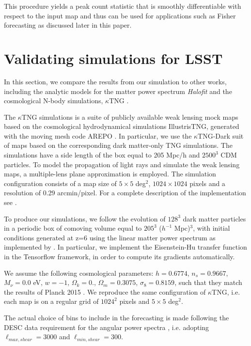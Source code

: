 \documentclass{aa}
\begin{document}
This procedure yields a peak count statistic that is smoothly differentiable with respect to the input map and thus can be used for applications such as Fisher forecasting as discussed later in this paper.

\section{Validating simulations for LSST}\label{Validating_simulations_for_LSST_Y}
In this section, we compare the results from our simulation to other works, including the analytic models for the matter power spectrum \textit{Halofit} \citep{smith2003stable,takahashi2012revising} and the cosmological N-body simulations, $\kappa$TNG \citep{osato2021kappatng}.


The $\kappa$TNG simulations is a suite of publicly available weak lensing mock maps based on the cosmological hydrodynamical simulations IllustrisTNG, generated with the moving mesh code AREPO \citep{2010MNRAS.401..791S}.
In particular, we use the $\kappa$TNG-Dark suit of maps based on the corresponding dark matter-only TNG simulations. 
The simulations have a side length of the box equal to 205 Mpc/h and $2500^3$ CDM particles.
To model the propagation of light rays and simulate the weak lensing maps, a multiple-lens plane approximation is employed. 
The simulation configuration consists of a map size of $5\times5$ deg$^2$, $1024\times 1024$ pixels and a resolution of 0.29 arcmin/pixel. 
For a complete description of the implementation see \cite{osato2021kappatng}.


To produce our simulations, we follow the evolution of $128^3$ dark matter particles in a periodic box of comoving volume equal to $205^3$ ($h^{-1}$ Mpc)$^3$, with initial conditions generated at z=6 using the linear matter power spectrum as implemented by \cite{eisenstein1998baryonic}. In particular, we implement the  Eisenstein-Hu transfer function in the Tensorflow framework, in order to compute its gradients automatically.

We assume the following cosmological parameters: $h=0.6774$, $n_s =0.9667$, $M_{\nu} = 0.0$ eV, $w=-1$, $\Omega_k = 0.$, $\Omega_m=0.3075$, $\sigma_8= 0.8159$, such that they match the results of Planck 2015 \citep{ade2016planck}.
We reproduce the same configuration of $\kappa$TNG, i.e. each map is on a regular grid of $1024^2$ pixels and $5\times 5$ deg$^2$.


The actual choice of bins to include in the forecasting is made following the DESC data requirement for the angular power spectra \citep{mandelbaum2018lsst}, i.e. adopting $\ell_{max,shear} = 3000$ and  $\ell_{min,shear} = 300$. 
\end{document}

